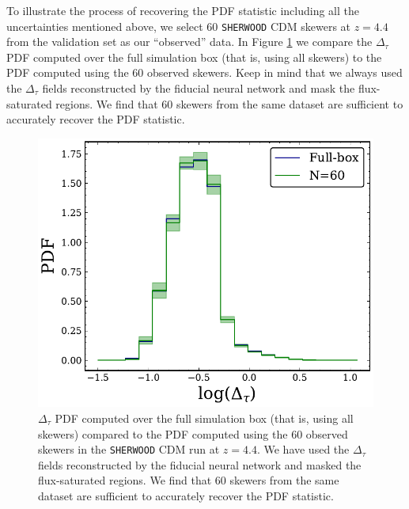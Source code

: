 To illustrate the process of recovering the PDF statistic including all the uncertainties mentioned above, we select 60 \texttt{SHERWOOD} CDM skewers at $z=4.4$ from the validation set as our ``observed'' data. In Figure \ref{fig: PDF sample vs full} we compare the $\Delta_\tau$ PDF computed over the full simulation box (that is, using all skewers) to the PDF computed using the 60 observed skewers. Keep in mind that we always used the $\Delta_\tau$ fields reconstructed by the fiducial neural network and mask the flux-saturated regions.
We find that 60 skewers from the same dataset are sufficient to accurately recover the PDF statistic.

\begin{figure}
    \centering
    \includegraphics[width=0.85\linewidth]{img/ML/PDF_full_vs_60.pdf}
    \caption{$\Delta_\tau$ PDF computed over the full simulation box (that is, using all skewers) compared to the PDF computed using the 60 observed skewers in the \texttt{SHERWOOD} CDM run at $z=4.4$. We have used the $\Delta_\tau$ fields reconstructed by the fiducial neural network and masked the flux-saturated regions.
    We find that 60 skewers from the same dataset are sufficient to accurately recover the PDF statistic.}
    \label{fig: PDF sample vs full}
\end{figure}


















































